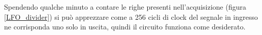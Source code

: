 Spendendo qualche minuto a contare le righe presenti nell'acquisizione (figura \ref{LFO_divider})
si può apprezzare come a 256 cicli di clock del segnale in ingresso ne corrisponda uno
solo in uscita, quindi il circuito funziona come desiderato.

